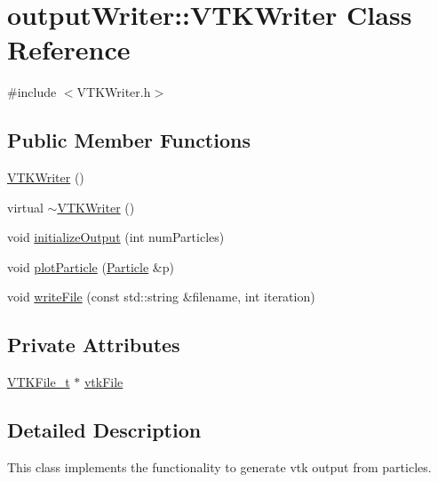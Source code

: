 \hypertarget{classoutputWriter_1_1VTKWriter}{\section{output\-Writer\-:\-:V\-T\-K\-Writer Class Reference}
\label{classoutputWriter_1_1VTKWriter}
}


{\ttfamily \#include $<$V\-T\-K\-Writer.\-h$>$}

\subsection*{Public Member Functions}
\begin{DoxyCompactItemize}
\item 
\hyperlink{classoutputWriter_1_1VTKWriter_a448311c322544e40c6e0a3c158924583}{V\-T\-K\-Writer} ()
\item 
virtual \hyperlink{classoutputWriter_1_1VTKWriter_a196a54bcfa3f93638ef292c386f91b61}{$\sim$\-V\-T\-K\-Writer} ()
\item 
void \hyperlink{classoutputWriter_1_1VTKWriter_a41cfcefce4d7eb434f1dd45f5aeb3e8f}{initialize\-Output} (int num\-Particles)
\item 
void \hyperlink{classoutputWriter_1_1VTKWriter_a6d3f50ca3ae2390055d3f9cc0ed1eb4d}{plot\-Particle} (\hyperlink{classParticle}{Particle} \&p)
\item 
void \hyperlink{classoutputWriter_1_1VTKWriter_ad0d7afb78a2027d05e9a03acde3799dd}{write\-File} (const std\-::string \&filename, int iteration)
\end{DoxyCompactItemize}
\subsection*{Private Attributes}
\begin{DoxyCompactItemize}
\item 
\hyperlink{classVTKFile__t}{V\-T\-K\-File\-\_\-t} $\ast$ \hyperlink{classoutputWriter_1_1VTKWriter_ab654ea4308b92e5dbdcd9a6833d5ed30}{vtk\-File}
\end{DoxyCompactItemize}


\subsection{Detailed Description}
This class implements the functionality to generate vtk output from particles. 

